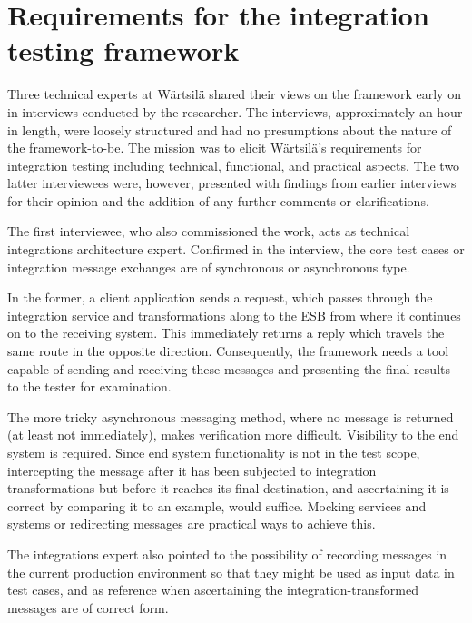 \documentclass[12pt,a4paper,oneside,pdftex]{report}
\begin{document}

\section{Requirements for the integration testing framework} 
\label{section:requirements}


Three technical experts at Wärtsilä shared their views on the framework early on in interviews conducted by the researcher. The interviews, approximately an hour in length, were loosely structured and had no presumptions about the nature of the framework-to-be. The mission was to elicit Wärtsilä's requirements for integration testing including technical, functional, and practical aspects. The two latter interviewees were, however, presented with findings from earlier interviews for their opinion and the addition of any further comments or clarifications.

The first interviewee, who also commissioned the work, acts as technical integrations architecture expert. Confirmed in the interview, the core test cases or integration message exchanges are of synchronous or asynchronous type. 

In the former, a client application sends a request, which passes through the integration service and transformations along to the ESB from where it continues on to the receiving system. This immediately returns a reply which travels the same route in the opposite direction. Consequently, the framework needs a tool capable of sending and receiving these messages and presenting the final results to the tester for examination.

The more tricky asynchronous messaging method, where no message is returned (at least not immediately), makes verification more difficult. Visibility to the end system is required. Since end system functionality is not in the test scope, intercepting the message after it has been subjected to integration transformations but before it reaches its final destination, and ascertaining it is correct by comparing it to an example, would suffice. Mocking services and systems or redirecting messages are practical ways to achieve this.

The integrations expert also pointed to the possibility of recording messages in the current production environment so that they might be used as input data in test cases, and as reference when ascertaining the integration-transformed messages are of correct form. 
\end{document}
